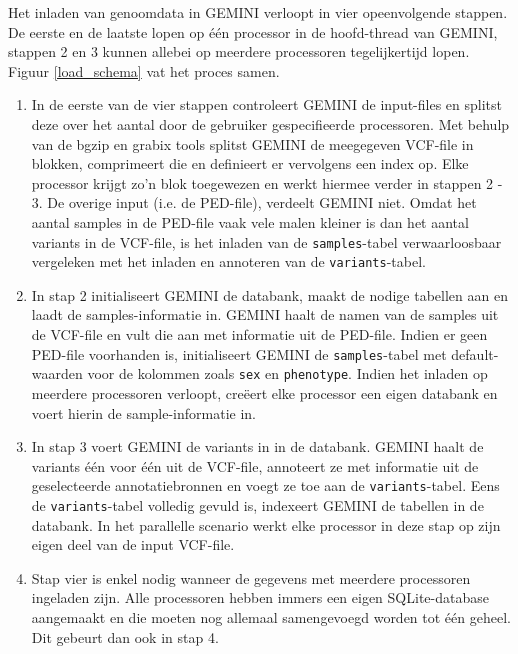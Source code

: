 \noindent Het inladen van genoomdata in GEMINI verloopt in vier opeenvolgende stappen. De eerste en de laatste lopen op \'e\'en processor in de hoofd-thread van GEMINI, stappen 2 en 3 kunnen allebei op meerdere processoren tegelijkertijd lopen. Figuur \ref{load_schema} vat het proces samen.
\begin{enumerate}
\item In de eerste van de vier stappen controleert GEMINI de input-files en splitst deze over het aantal door de gebruiker gespecifieerde processoren. Met behulp van de bgzip \cite{bgzip} en grabix \cite{grabix} tools splitst GEMINI de meegegeven VCF-file in blokken, comprimeert die en definieert er vervolgens een index op. Elke processor krijgt zo'n blok toegewezen en werkt hiermee verder in stappen 2 - 3. De overige input (i.e. de PED-file), verdeelt GEMINI niet. Omdat het aantal samples in de PED-file vaak vele malen kleiner is dan het aantal variants in de VCF-file, is het inladen van de \texttt{samples}-tabel verwaarloosbaar vergeleken met het inladen en annoteren van de \texttt{variants}-tabel.
\item In stap 2 initialiseert GEMINI de databank, maakt de nodige tabellen aan en laadt de samples-informatie in. GEMINI haalt de namen van de samples uit de VCF-file en vult die aan met informatie uit de PED-file. Indien er geen PED-file voorhanden is, initialiseert GEMINI de \texttt{samples}-tabel met default-waarden voor de kolommen zoals \texttt{sex} en \texttt{phenotype}. Indien het inladen op meerdere processoren verloopt, cre\"eert elke processor een eigen databank en voert hierin de sample-informatie in.
\item In stap 3 voert GEMINI de variants in in de databank. GEMINI haalt de variants \'e\'en voor \'e\'en uit de VCF-file, annoteert ze met informatie uit de geselecteerde annotatiebronnen en voegt ze toe aan de \texttt{variants}-tabel. Eens de \texttt{variants}-tabel volledig gevuld is, indexeert GEMINI de tabellen in de databank. In het parallelle scenario werkt elke processor in deze stap op zijn eigen deel van de input VCF-file.
\item Stap vier is enkel nodig wanneer de gegevens met meerdere processoren ingeladen zijn. Alle processoren hebben immers een eigen SQLite-database aangemaakt en die moeten nog allemaal samengevoegd worden tot \'e\'en geheel. Dit gebeurt dan ook in stap 4.\\\\
\end{enumerate}

